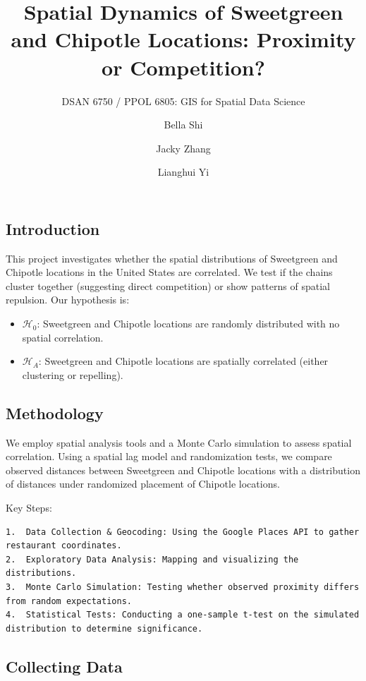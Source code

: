 \documentclass[
  letterpaper,
  DIV=11,
  numbers=noendperiod]{scrartcl}
\title{Spatial Dynamics of Sweetgreen and Chipotle Locations: Proximity
or Competition?}
\subtitle{DSAN 6750 / PPOL 6805: GIS for Spatial Data Science}
\author{Bella Shi \and Jacky Zhang \and Lianghui Yi}
\date{}
\begin{document}
\maketitle

\subsection{Introduction}\label{introduction}

This project investigates whether the spatial distributions of
Sweetgreen and Chipotle locations in the United States are correlated.
We test if the chains cluster together (suggesting direct competition)
or show patterns of spatial repulsion. Our hypothesis is:

\begin{itemize}
\item
  \(\mathcal{H}_0\): Sweetgreen and Chipotle locations are randomly
  distributed with no spatial correlation.
\item
  \(\mathcal{H}_A\): Sweetgreen and Chipotle locations are spatially
  correlated (either clustering or repelling).
\end{itemize}

\subsection{Methodology}\label{methodology}

We employ spatial analysis tools and a Monte Carlo simulation to assess
spatial correlation. Using a spatial lag model and randomization tests,
we compare observed distances between Sweetgreen and Chipotle locations
with a distribution of distances under randomized placement of Chipotle
locations.

Key Steps:

\begin{verbatim}
1.  Data Collection & Geocoding: Using the Google Places API to gather restaurant coordinates.
2.  Exploratory Data Analysis: Mapping and visualizing the distributions.
3.  Monte Carlo Simulation: Testing whether observed proximity differs from random expectations.
4.  Statistical Tests: Conducting a one-sample t-test on the simulated distribution to determine significance.
\end{verbatim}

\subsection{Collecting Data}\label{collecting-data}
\end{document}
